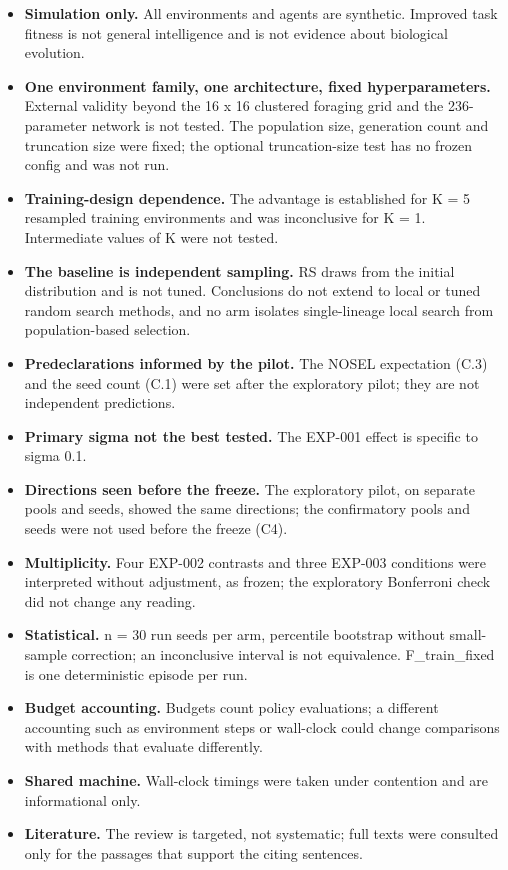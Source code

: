 \documentclass[
]{article}
\providecommand{\tightlist}{%
  \setlength{\itemsep}{0pt}\setlength{\parskip}{0pt}}
\begin{document}
\begin{itemize}
\tightlist
\item
  \textbf{Simulation only.} All environments and agents are synthetic.
  Improved task fitness is not general intelligence and is not evidence
  about biological evolution.
\item
  \textbf{One environment family, one architecture, fixed
  hyperparameters.} External validity beyond the 16 x 16 clustered
  foraging grid and the 236-parameter network is not tested. The
  population size, generation count and truncation size were fixed; the
  optional truncation-size test has no frozen config and was not run.
\item
  \textbf{Training-design dependence.} The advantage is established for
  K = 5 resampled training environments and was inconclusive for K = 1.
  Intermediate values of K were not tested.
\item
  \textbf{The baseline is independent sampling.} RS draws from the
  initial distribution and is not tuned. Conclusions do not extend to
  local or tuned random search methods, and no arm isolates
  single-lineage local search from population-based selection.
\item
  \textbf{Predeclarations informed by the pilot.} The NOSEL expectation
  (C.3) and the seed count (C.1) were set after the exploratory pilot;
  they are not independent predictions.
\item
  \textbf{Primary sigma not the best tested.} The EXP-001 effect is
  specific to sigma 0.1.
\item
  \textbf{Directions seen before the freeze.} The exploratory pilot, on
  separate pools and seeds, showed the same directions; the confirmatory
  pools and seeds were not used before the freeze (C4).
\item
  \textbf{Multiplicity.} Four EXP-002 contrasts and three EXP-003
  conditions were interpreted without adjustment, as frozen; the
  exploratory Bonferroni check did not change any reading.
\item
  \textbf{Statistical.} n = 30 run seeds per arm, percentile bootstrap
  without small-sample correction; an inconclusive interval is not
  equivalence. F\_train\_fixed is one deterministic episode per run.
\item
  \textbf{Budget accounting.} Budgets count policy evaluations; a
  different accounting such as environment steps or wall-clock could
  change comparisons with methods that evaluate differently.
\item
  \textbf{Shared machine.} Wall-clock timings were taken under
  contention and are informational only.
\item
  \textbf{Literature.} The review is targeted, not systematic; full
  texts were consulted only for the passages that support the citing
  sentences.
\end{itemize}
\end{document}
